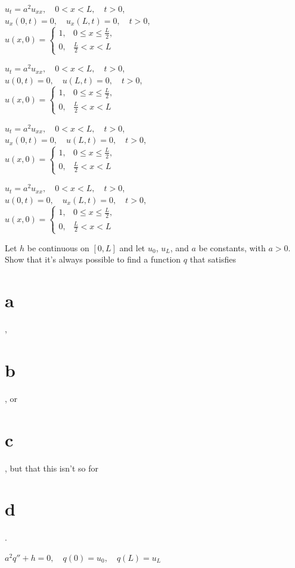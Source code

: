 \begin{exerciselist}
  \item\label{exer:12.1.43} \Cex $u_{t}=a^{2}u_{xx},\quad0<x<L,\quad t>0$,\\ $u_{x}(0,t)=0,\quad u_{x}(L,t)=0,\quad t>0$,\\ $u(x,0)= \left\{
  \begin{array}{cl}
    1, & 0\le x\le\frac{L}{2}, \\
    0, & \frac{L}{2}<x<L
  \end{array}\right.$

  \item\label{exer:12.1.44} \Cex $u_{t}=a^{2}u_{xx},\quad0<x<L,\quad t>0$,\\ $u(0,t)=0,\quad u(L,t)=0,\quad t>0$,\\ $u(x,0)= \left\{
  \begin{array}{cl}
    1, & 0\le x\le\frac{L}{2}, \\
    0, & \frac{L}{2}<x<L
  \end{array}\right.$

  \item\label{exer:12.1.45} \Cex $u_{t}=a^{2}u_{xx},\quad0<x<L,\quad t>0$,\\ $u_{x}(0,t)=0,\quad u(L,t)=0,\quad t>0$,\\ $u(x,0)= \left\{
  \begin{array}{cl}
    1, & 0\le x\le\frac{L}{2}, \\
    0, & \frac{L}{2}<x<L
  \end{array}\right.$

  \item\label{exer:12.1.46} \Cex $u_{t}=a^{2}u_{xx},\quad0<x<L,\quad t>0$,\\ $u(0,t)=0,\quad u_{x}(L,t)=0,\quad t>0$,\\ $u(x,0)= \left\{
  \begin{array}{cl}
    1, & 0\le x\le\frac{L}{2}, \\
    0, & \frac{L}{2}<x<L
  \end{array}\right.$

  \item\label{exer:12.1.47} Let $h$ be continuous on $[0,L]$ and let $u_{0}$, $u_{L}$, and $a$ be
        constants, with $a>0$. Show that it's always possible to find a function $q$ that satisfies
        \part{a}, \part{b}, or \part{c}, but that this isn't so for \part{d}.
  \begin{alist}
    \item %
    $a^{2}q''+h=0,\quad q(0)=u_{0},\quad q(L)=u_{L}$


\end{alist}
\end{exerciselist}
